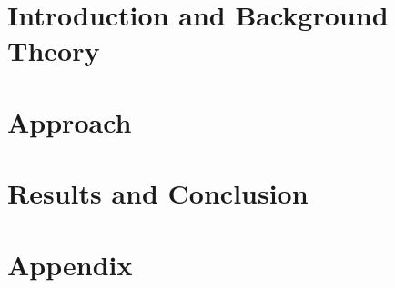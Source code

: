 
\addtolength{\evensidemargin}{-12mm}

%
%
\part[Introduction and Background Theory]{Introduction and Background Theory}
\label{part:introAndBackgroundTheory}


%
\part[Body]{Approach}
\label{part:body}





\part[Results and Conclusion]{Results and Conclusion}
\label{part:resultsAndConclusion}


%
%
\part*{Appendix}

\appendix %


